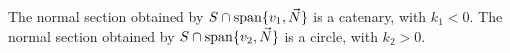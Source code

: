         The normal section obtained by \(S\cap \operatorname{span}\{v_1,\vec{N}\}\)
        is a catenary, with \(k_1<0\). The normal section obtained by 
        \(S\cap \operatorname{span}\{v_2,\vec{N}\}\) is a circle, with \(k_2>0\).
        \begin{center}

\end{center}
